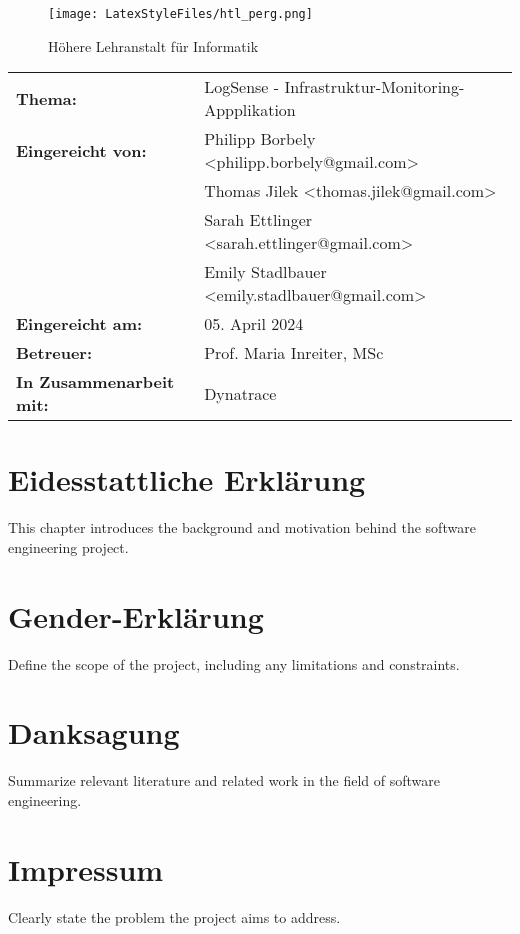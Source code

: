 \documentclass{report}
\begin{document}
\begin{figure}[H]
    \centering
    \texttt{[image: LatexStyleFiles/htl\_perg.png]}
    \caption{Höhere Lehranstalt für Informatik}
\end{figure}

\renewcommand{\arraystretch}{1.5}
\begin{table}[h]
    \centering
    \begin{tabular}{ll}
        \textbf{Thema:} & LogSense - Infrastruktur-Monitoring-Appplikation \\
        \textbf{Eingereicht von:} & Philipp Borbely \textless philipp.borbely@gmail.com\textgreater \\
                                   & Thomas Jilek \textless thomas.jilek@gmail.com\textgreater \\
                                   & Sarah Ettlinger \textless sarah.ettlinger@gmail.com\textgreater \\
                                   & Emily Stadlbauer \textless emily.stadlbauer@gmail.com\textgreater \\
        \textbf{Eingereicht am:} & 05. April 2024 \\
        \textbf{Betreuer:} & Prof. Maria Inreiter, MSc \\
        \textbf{In Zusammenarbeit mit:} & Dynatrace
    \end{tabular}
\end{table}

\tableofcontents

\chapter*{Eidesstattliche Erklärung}
This chapter introduces the background and motivation behind the software engineering project.

\chapter*{Gender-Erklärung}
Define the scope of the project, including any limitations and constraints.

\chapter*{Danksagung}
Summarize relevant literature and related work in the field of software engineering.

\chapter*{Impressum}
Clearly state the problem the project aims to address.
\end{document}
